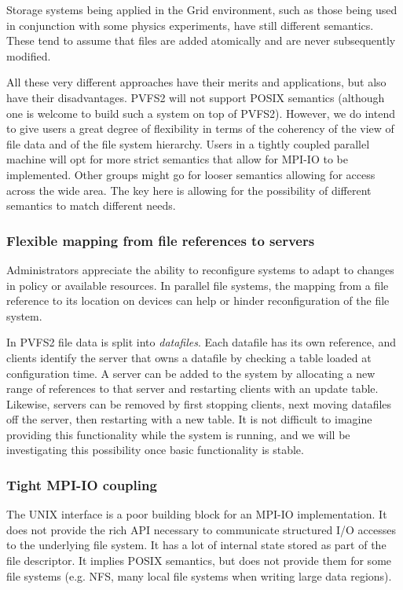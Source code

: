 Storage systems being applied in the Grid environment, such as those being
used in conjunction with some physics experiments, have still different
semantics.  These tend to assume that files are added atomically and are never
subsequently modified.

All these very different approaches have their merits and applications, but
also have their disadvantages.  PVFS2 will not support POSIX semantics
(although one is welcome to build such a system on top of PVFS2).  However, we
do intend to give users a great degree of flexibility in terms of the
coherency of the view of file data and of the file system hierarchy.  Users in
a tightly coupled parallel machine will opt for more strict semantics that
allow for MPI-IO to be implemented.  Other groups might go for looser
semantics allowing for access across the wide area.  The key here is allowing
for the possibility of different semantics to match different needs.

\subsubsection{Flexible mapping from file references to servers}

Administrators appreciate the ability to reconfigure systems to adapt to
changes in policy or available resources.  In parallel file systems, the
mapping from a file reference to its location on devices can help or hinder
reconfiguration of the file system.

In PVFS2 file data is split into \emph{datafiles}.  Each datafile has its own
reference, and clients identify the server that owns a datafile by checking a
table loaded at configuration time.  A server can be added to the system by
allocating a new range of references to that server and restarting clients
with an update table.  Likewise, servers can be removed by first stopping
clients, next moving datafiles off the server, then restarting with a new
table.  It is not difficult to imagine providing this functionality while the
system is running, and we will be investigating this possibility once basic
functionality is stable.

\subsubsection{Tight MPI-IO coupling}

The UNIX interface is a poor building block for an MPI-IO implementation.  It
does not provide the rich API necessary to communicate structured I/O accesses
to the underlying file system.  It has a lot of internal state stored as part
of the file descriptor.  It implies POSIX semantics, but does not provide them
for some file systems (e.g. NFS, many local file systems when writing large
data regions).

